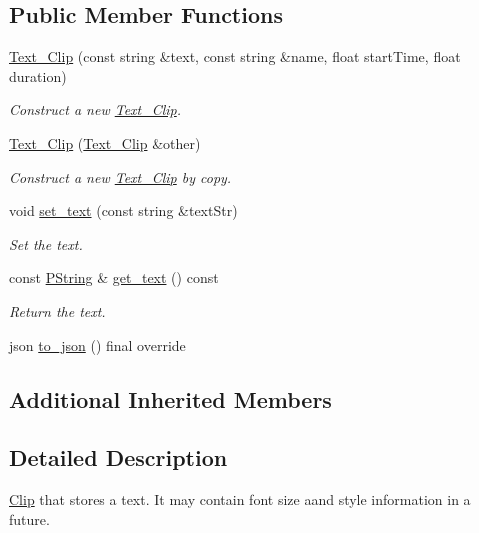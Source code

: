 \subsection*{Public Member Functions}
\begin{DoxyCompactItemize}
\item 
\mbox{\hyperlink{classprz_1_1_text___clip_a737a4d39a59cc1d2b80c92a36307f375}{Text\+\_\+\+Clip}} (const string \&text, const string \&name, float start\+Time, float duration)
\begin{DoxyCompactList}\small\item\em Construct a new \mbox{\hyperlink{classprz_1_1_text___clip}{Text\+\_\+\+Clip}}. \end{DoxyCompactList}\item 
\mbox{\hyperlink{classprz_1_1_text___clip_a0f6a6b80f74e6125be7ffeca1bf648fb}{Text\+\_\+\+Clip}} (\mbox{\hyperlink{classprz_1_1_text___clip}{Text\+\_\+\+Clip}} \&other)
\begin{DoxyCompactList}\small\item\em Construct a new \mbox{\hyperlink{classprz_1_1_text___clip}{Text\+\_\+\+Clip}} by copy. \end{DoxyCompactList}\item 
void \mbox{\hyperlink{classprz_1_1_text___clip_a202deb59702755d44bcec29fc7e69f8c}{set\+\_\+text}} (const string \&text\+Str)
\begin{DoxyCompactList}\small\item\em Set the text. \end{DoxyCompactList}\item 
const \mbox{\hyperlink{classprz_1_1_p_string}{P\+String}} \& \mbox{\hyperlink{classprz_1_1_text___clip_a9d7e0f330a7ced112c9e6acb6ec9f29d}{get\+\_\+text}} () const
\begin{DoxyCompactList}\small\item\em Return the text. \end{DoxyCompactList}\item 
json \mbox{\hyperlink{classprz_1_1_text___clip_a4e78e6e36c130ed42ec7f75772e3baed}{to\+\_\+json}} () final override
\end{DoxyCompactItemize}
\subsection*{Additional Inherited Members}


\subsection{Detailed Description}
\mbox{\hyperlink{classprz_1_1_clip}{Clip}} that stores a text. It may contain font size aand style information in a future. 



